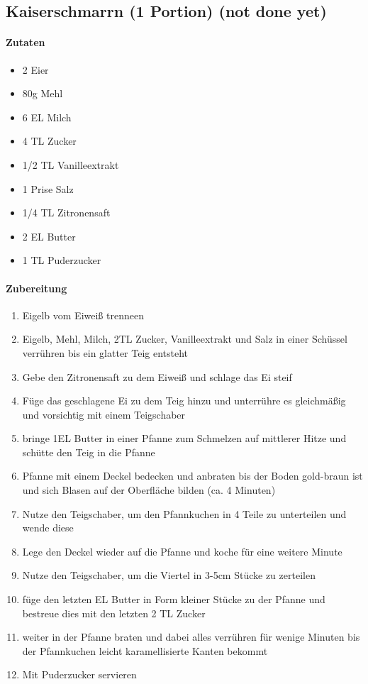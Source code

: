 \newpage
\subsection{Kaiserschmarrn (1 Portion) (not done yet)}
\paragraph{Zutaten}
\begin{itemize}[noitemsep]
	\item 2 Eier
	\item 80g Mehl
	\item 6 EL Milch
	\item 4 TL Zucker 
	\item 1/2 TL Vanilleextrakt
	\item 1 Prise Salz
	\item 1/4 TL Zitronensaft
	\item 2 EL Butter
	\item 1 TL Puderzucker
\end{itemize}
\paragraph{Zubereitung}
\begin{enumerate}[noitemsep]
	\item Eigelb vom Eiweiß trenneen
	\item Eigelb, Mehl, Milch, 2TL Zucker, Vanilleextrakt und Salz in einer Schüssel verrühren bis ein glatter Teig entsteht
	\item Gebe den Zitronensaft zu dem Eiweiß und schlage das Ei steif
	\item Füge das geschlagene Ei zu dem Teig hinzu und unterrühre es gleichmäßig und vorsichtig mit einem Teigschaber
	\item bringe 1EL Butter in einer Pfanne zum Schmelzen auf mittlerer Hitze und schütte den Teig in die Pfanne
	\item Pfanne mit einem Deckel bedecken und anbraten bis der Boden gold-braun ist und sich Blasen auf der Oberfläche bilden (ca. 4 Minuten)
	\item Nutze den Teigschaber, um den Pfannkuchen in 4 Teile zu unterteilen und wende diese
	\item Lege den Deckel wieder auf die Pfanne und koche für eine weitere Minute
	\item Nutze den Teigschaber, um die Viertel in 3-5cm Stücke zu zerteilen
	\item füge den letzten EL Butter in Form kleiner Stücke zu der Pfanne und bestreue dies mit den letzten 2 TL Zucker
	\item weiter in der Pfanne braten und dabei alles verrühren für wenige Minuten bis der Pfannkuchen leicht karamellisierte Kanten bekommt
	\item Mit Puderzucker servieren
\end{enumerate}

